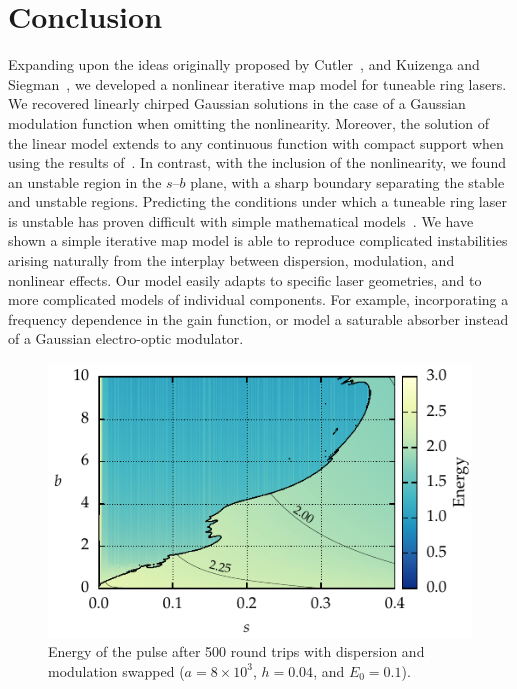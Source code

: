\documentclass[9pt,twocolumn,twoside]{osajnl}
\begin{document}
\section{Conclusion}
\label{sec:conclusion}
Expanding upon the ideas originally proposed by Cutler~\cite{cutler1955}, and Kuizenga and Siegman~\cite{kuizenga1970, kuizenga1970a, siegman1969}, we developed a nonlinear iterative map model for tuneable ring lasers. We recovered linearly chirped Gaussian solutions in the case of a Gaussian modulation function when omitting the nonlinearity. Moreover, the solution of the linear model extends to any continuous function with compact support when using the results of~\cite{calcaterra2008a}. In contrast, with the inclusion of the nonlinearity, we found an unstable region in the $s$--$b$ plane, with a sharp boundary separating the stable and unstable regions. Predicting the conditions under which a tuneable ring laser is unstable has proven difficult with simple mathematical models~\cite{meng2020}. We have shown a simple iterative map model is able to reproduce complicated instabilities arising naturally from the interplay between dispersion, modulation, and nonlinear effects. Our model easily adapts to specific laser geometries, and to more complicated models of individual components. For example, incorporating a frequency dependence in the gain function, or model a saturable absorber instead of a Gaussian electro-optic modulator.

\begin{figure}[tbp]
	\centering
	\includegraphics{Figures/ParamSpaceEnergySwitch}
	\caption{Energy of the pulse after 500 round trips with dispersion and modulation swapped ($a = 8 \times 10^3$, $h = 0.04$, and $E_0 = 0.1$).}
	\label{fig:energyswitch}
\end{figure}
\end{document}
